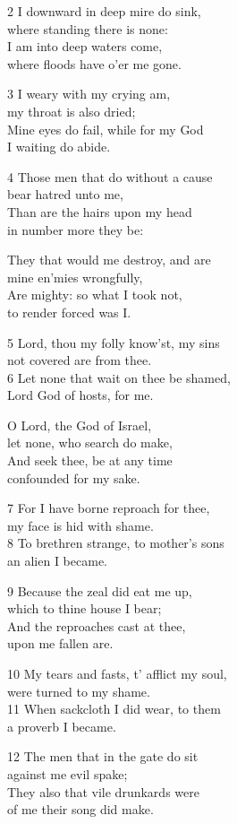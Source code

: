 \begin{multicols}{3}
2 I downward in deep mire do sink,\\
where standing there is none:\\
I am into deep waters come,\\
where floods have o’er me gone.

3 I weary with my crying am,\\
my throat is also dried;\\
Mine eyes do fail, while for my God\\
I waiting do abide.

4 Those men that do without a cause\\
bear hatred unto me,\\
Than are the hairs upon my head\\
in number more they be:

They that would me destroy, and are\\
mine en’mies wrongfully,\\
Are mighty: so what I took not,\\
to render forced was I.

5 Lord, thou my folly know’st, my sins\\
not covered are from thee.\\
6 Let none that wait on thee be shamed,\\
Lord God of hosts, for me.

O Lord, the God of Israel,\\
let none, who search do make,\\
And seek thee, be at any time\\
confounded for my sake.

7 For I have borne reproach for thee,\\
my face is hid with shame.\\
8 To brethren strange, to mother’s sons\\
an alien I became.

9 Because the zeal did eat me up,\\
which to thine house I bear;\\
And the reproaches cast at thee,\\
upon me fallen are.

10 My tears and fasts, t’ afflict my soul,\\
were turned to my shame.\\
11 When sackcloth I did wear, to them\\
a proverb I became.

12 The men that in the gate do sit\\
against me evil spake;\\
They also that vile drunkards were\\
of me their song did make.


\end{multicols}
